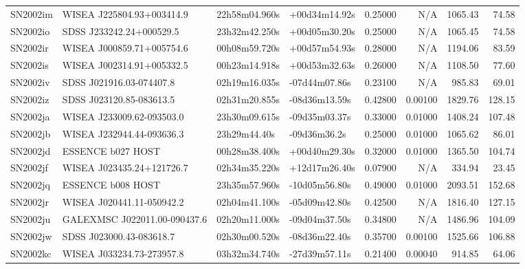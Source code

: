 \begin{longtable}{llllrrrr}
SN2002im         &       WISEA J225804.93+003414.9 &   22h58m04.960s &   +00d34m14.92s &  0.25000 &      N/A &  1065.43 &       74.58 \\
SN2002io         &        SDSS J233242.24+000529.5 &   23h32m42.250s &   +00d05m30.20s &  0.25000 &      N/A &  1065.45 &       74.58 \\
SN2002ir         &       WISEA J000859.71+005754.6 &   00h08m59.720s &   +00d57m54.93s &  0.28000 &      N/A &  1194.06 &       83.59 \\
SN2002is         &       WISEA J002314.91+005332.5 &   00h23m14.918s &   +00d53m32.63s &  0.26000 &      N/A &  1108.50 &       77.60 \\
SN2002iv         &        SDSS J021916.03-074407.8 &   02h19m16.035s &   -07d44m07.86s &  0.23100 &      N/A &   985.83 &       69.01 \\
SN2002iz         &        SDSS J023120.85-083613.5 &   02h31m20.855s &   -08d36m13.59s &  0.42800 &  0.00100 &  1829.76 &      128.15 \\
SN2002ja         &       WISEA J233009.62-093503.0 &   23h30m09.615s &   -09d35m03.37s &  0.33000 &  0.01000 &  1408.24 &      107.48 \\
SN2002jb         &       WISEA J232944.44-093636.3 &    23h29m44.40s &    -09d36m36.2s &  0.25000 &  0.01000 &  1065.62 &       86.01 \\
SN2002jd         &               ESSENCE b027 HOST &   00h28m38.400s &   +00d40m29.30s &  0.32000 &  0.01000 &  1365.50 &      104.74 \\
SN2002jf         &       WISEA J023435.24+121726.7 &   02h34m35.220s &   +12d17m26.40s &  0.07900 &      N/A &   334.94 &       23.45 \\
SN2002jq         &               ESSENCE b008 HOST &   23h35m57.960s &   -10d05m56.80s &  0.49000 &  0.01000 &  2093.51 &      152.68 \\
SN2002jr         &       WISEA J020441.11-050942.2 &   02h04m41.100s &   -05d09m42.80s &  0.42500 &      N/A &  1816.40 &      127.15 \\
SN2002ju         &  GALEXMSC J022011.00-090437.6   &   02h20m11.000s &   -09d04m37.50s &  0.34800 &      N/A &  1486.96 &      104.09 \\
SN2002jw         &        SDSS J023000.43-083618.7 &   02h30m00.520s &   -08d36m22.40s &  0.35700 &  0.00100 &  1525.66 &      106.88 \\
SN2002kc         &       WISEA J033234.73-273957.8 &   03h32m34.740s &   -27d39m57.11s &  0.21400 &  0.00040 &   914.85 &       64.06 \\

\end{longtable}
